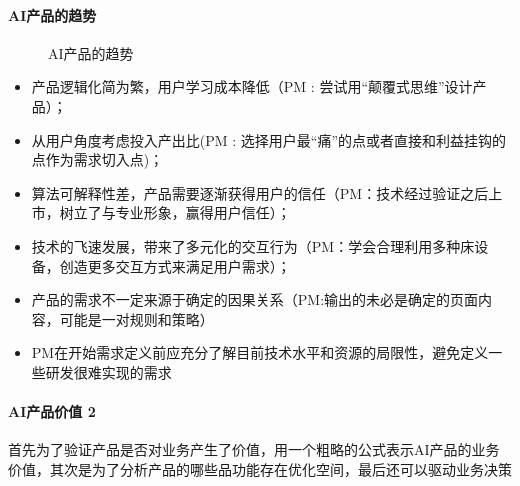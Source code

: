 \documentclass[letterpaper,10pt,english]{sphinxmanual}
\begin{document}
\paragraph{AI产品的趋势}
\label{\detokenize{chapter_introduction/AI_Product:id7}}
\begin{figure}[H]
\centering
\capstart

\noindent{}
\caption{AI产品的趋势\sphinxfootnotemark[245]}\label{\detokenize{chapter_introduction/AI_Product:id19}}\end{figure}
%
\begin{footnotetext}[245]\sphinxAtStartFootnote
{}
%
\end{footnotetext}\ignorespaces \begin{itemize}
\item {} 
产品逻辑化简为繁，用户学习成本降低（PM :
尝试用“颠覆式思维”设计产品）；

\item {} 
从用户角度考虑投入产出比(PM :
选择用户最“痛”的点或者直接和利益挂钩的点作为需求切入点)；

\item {} 
算法可解释性差，产品需要逐渐获得用户的信任（PM：技术经过验证之后上市，树立了与专业形象，赢得用户信任）；

\item {} 
技术的飞速发展，带来了多元化的交互行为（PM：学会合理利用多种床设备，创造更多交互方式来满足用户需求）；

\item {} 
产品的需求不一定来源于确定的因果关系（PM:输出的未必是确定的页面内容，可能是一对规则和策略）

\item {} 
PM在开始需求定义前应充分了解目前技术水平和资源的局限性，避免定义一些研发很难实现的需求

\end{itemize}


\paragraph{AI产品价值 2\sphinxfootnotemark[246]}
\label{\detokenize{chapter_introduction/AI_Product:ai-2}}%
\begin{footnotetext}[246]\sphinxAtStartFootnote
{}
%
\end{footnotetext}\ignorespaces 
首先为了验证产品是否对业务产生了价值，用一个粗略的公式表示AI产品的业务价值，其次是为了分析产品的哪些品功能存在优化空间，最后还可以驱动业务决策
\end{document}
